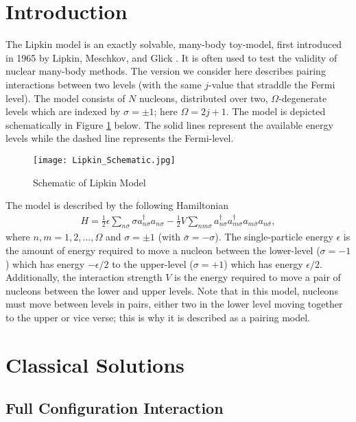 \documentclass[Dual]{msu-thesis}
\begin{document}
\section{Introduction}

The Lipkin model is an exactly solvable, many-body toy-model, first introduced in 1965 by Lipkin, Meschkov, and Glick \cite{ref:lipkin}. It is often used to test the validity of nuclear many-body methods. The version we consider here describes pairing interactions between two levels (with the same $j$-value that straddle the Fermi level). The model consists of $N$ nucleons, distributed over two, $\Omega$-degenerate levels which are indexed by $\sigma=\pm1$; here $\Omega=2j+1$. The model is depicted schematically in Figure \ref{fig:lipkin_schem} below. The solid lines represent the available energy levels while the dashed line represents the Fermi-level.
\begin{figure}[b]
    \centering
    \texttt{[image: Lipkin\_Schematic.jpg]}
    \caption{Schematic of Lipkin Model}
    \label{fig:lipkin_schem}
\end{figure}
The model is described by the following Hamiltonian
\begin{align}
\label{hamiltonian}
H
=
\frac{1}{2}\epsilon\sum_{n\sigma}\sigma a^\dagger_{n\sigma}a_{n\sigma}
-
\frac{1}{2}V
\sum_{nm\sigma}a^\dagger_{n\sigma}a^\dagger_{m\sigma}a_{m\bar{\sigma}}a_{n\bar{\sigma}}
,\end{align}
where $n,m=1,2,...,\Omega$ and $\sigma=\pm1$ (with $\bar{\sigma}=-\sigma$). The single-particle energy $\epsilon$ is the amount of energy required to move a nucleon between the lower-level ($\sigma=-1$) which has energy $-\epsilon/2$ to the upper-level ($\sigma=+1$) which has energy $\epsilon/2$. Additionally, the interaction strength $V$ is the energy required to move a pair of nucleons between the lower and upper levels. Note that in this model, nucleons must move between levels in pairs, either two in the lower level moving together to the upper or vice verse; this is why it is described as a pairing model.

\section{Classical Solutions}

\nocite{ref:lipkin_slide}

\subsection{Full Configuration Interaction}
\end{document}
